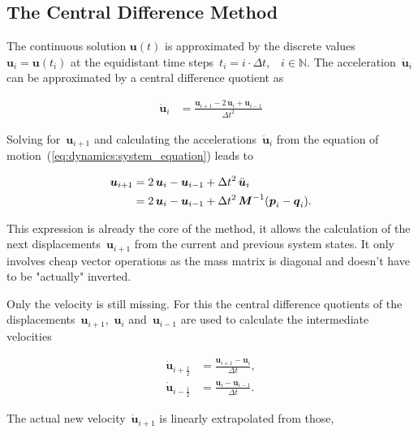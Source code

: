\subsection{The Central Difference Method}

The continuous solution $\boldsymbol{u}(t)$ is approximated by the discrete values~$\boldsymbol{u}_i = \boldsymbol{u}(t_{i})$ at the equidistant time steps~$t_i = i\cdot\Delta t$,\ \ $i \in \mathbb{N}$.
The acceleration~$\ddot{\boldsymbol{u}}_i$ can be approximated by a central difference quotient as

\begin{align}
\ddot{\boldsymbol{u}}_i &= \frac{\boldsymbol{u}_{i+1} - 2\,\boldsymbol{u}_{i} + \boldsymbol{u}_{i-1}}{\Delta t^2}\label{eq:dynamics:difference_acceleration}
\end{align}

Solving for~$\boldsymbol{u}_{i+1}$ and calculating the accelerations~$\ddot{\boldsymbol{u}}_{i}$ from the equation of motion~(\ref{eq:dynamics:system_equation}) leads to

\begin{align}
\boldsymbol{u}_{i+1} &= 2\,\boldsymbol{u}_{i} - \boldsymbol{u}_{i-1} + \Delta t^2\,\ddot{\boldsymbol{u}}_{i}\notag\\
&= 2\,\boldsymbol{u}_{i} - \boldsymbol{u}_{i-1} + \Delta t^2\,\boldsymbol{M}^{-1}(\boldsymbol{p}_i - \boldsymbol{q}_i).
\end{align}

This expression is already the core of the method, it allows the calculation of the next displacements~$\boldsymbol{u}_{i+1}$ from the current and previous system states.
It only involves cheap vector operations as the mass matrix is diagonal and doesn't have to be "actually" inverted.

Only the velocity is still missing. For this the central difference quotients of the displacements~$\boldsymbol{u}_{i+1}$,~$\boldsymbol{u}_{i}$ and~$\boldsymbol{u}_{i-1}$ are used to calculate the intermediate velocities

\begin{align}
\dot{\boldsymbol{u}}_{i+\frac{1}{2}} &= \frac{\boldsymbol{u}_{i+1} - \boldsymbol{u}_{i}}{\Delta t},\\
\dot{\boldsymbol{u}}_{i-\frac{1}{2}} &= \frac{\boldsymbol{u}_{i} - \boldsymbol{u}_{i-1}}{\Delta t}.
\end{align} 

The actual new velocity~$\dot{\boldsymbol{u}}_{i+1}$ is linearly extrapolated from those,

